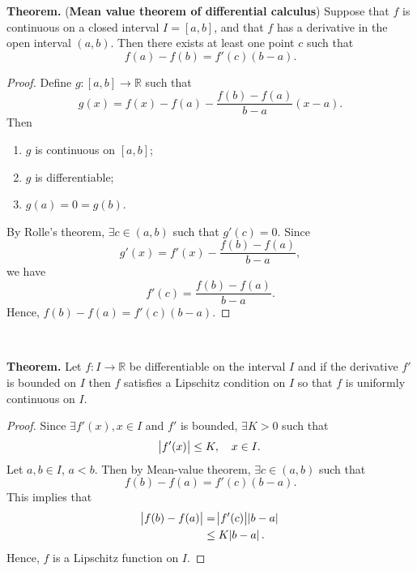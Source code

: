 \documentclass[12pt,a4paper]{article}
\begin{document}
\begin{tcolorbox}[colback=white]
	\textbf{Theorem.} (\textbf{Mean value theorem of differential calculus}) Suppose that $f$ is continuous on a closed interval $I=[a,b]$, and that $f$ has a derivative in the open interval $(a,b)$. Then there exists at least one point $c$ such that \[
	f(a)-f(b)=f'(c)(b-a).
	\]\tcblower\begin{proof}
		Define $g:[a,b]\to\mathbb{R}$ such that \[
		g(x)=f(x)-f(a)-\frac{f(b)-f(a)}{b-a}(x-a).
		\] Then \begin{enumerate}[($i$)]
			\item $g$ is continuous on $[a,b]$;
			\item $g$ is differentiable;
			\item $g(a)=0=g(b)$.
		\end{enumerate} By Rolle's theorem, $\exists c\in (a,b)$ such that $g'(c)=0$. Since \[
	g'(x)=f'(x)-\frac{f(b)-f(a)}{b-a},
	\] we have \[
	f'(c)=\frac{f(b)-f(a)}{b-a}.
	\] Hence, $f(b)-f(a)=f'(c)(b-a)$.
	\end{proof}
\end{tcolorbox}
\
\begin{tcolorbox}[colback=white]
	\textbf{Theorem.} Let $f:I\to\mathbb{R}$ be differentiable on the interval $I$ and if the derivative $f'$ is bounded on $I$ then $f$ satisfies a Lipschitz condition on $I$ so that $f$ is uniformly continuous on $I$.\tcblower\begin{proof}
		Since $\exists f'(x), x\in I$ and $f'$ is bounded, $\exists K>0$ such that \[
		\abs{f'(x)}\leq K,\quad x\in I.
		\] Let $a,b\in I$, $a<b$. Then by Mean-value theorem, $\exists c\in(a,b)$ such that \[
		f(b)-f(a)=f'(c)(b-a).
		\] This implies that \begin{align*}
		\abs{f(b)-f(a)}&=\abs{f'(c)}\abs{b-a} \\
		&\leq K\abs{b-a}.
		\end{align*} Hence, $f$ is a Lipschitz function on $I$.
	\end{proof}
\end{tcolorbox}
\end{document}
